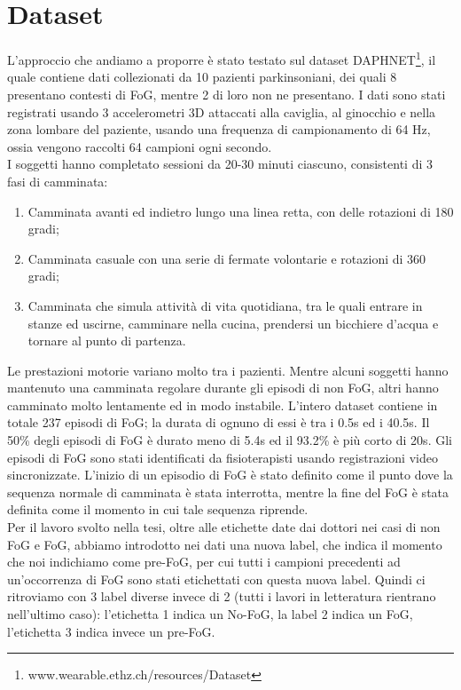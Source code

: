 \section{Dataset}
L'approccio che andiamo a proporre è stato testato sul dataset DAPHNET\footnote{www.wearable.ethz.ch/resources/Dataset}, il quale contiene dati collezionati da 10 pazienti parkinsoniani, dei quali 8 presentano contesti di FoG, mentre 2 di loro non ne presentano. I dati sono stati registrati usando 3 accelerometri 3D attaccati alla caviglia, al ginocchio e nella zona lombare del paziente, usando una frequenza di campionamento di 64 Hz, ossia vengono raccolti 64 campioni ogni secondo.\\
I soggetti hanno completato sessioni da 20-30 minuti ciascuno, consistenti di 3 fasi di camminata:
\begin{enumerate}
	\item Camminata avanti ed indietro lungo una linea retta, con delle rotazioni di 180 gradi;
	\item Camminata casuale con una serie di fermate volontarie e rotazioni di 360 gradi;
	\item Camminata che simula attività di vita quotidiana, tra le quali entrare in stanze ed uscirne, camminare nella cucina, prendersi un bicchiere d'acqua e tornare al punto di partenza.
\end{enumerate}
Le prestazioni motorie variano molto tra i pazienti. Mentre alcuni soggetti hanno mantenuto una camminata regolare durante gli episodi di non FoG, altri hanno camminato molto lentamente ed in modo instabile. L'intero dataset contiene in totale 237 episodi di FoG; la durata di ognuno di essi è tra i 0.5s ed i 40.5s. Il 50\% degli episodi di FoG è durato meno di 5.4s ed il 93.2\% è più corto di 20s. Gli episodi di FoG sono stati identificati da fisioterapisti usando registrazioni video sincronizzate. L'inizio di un episodio di FoG è stato definito come il punto dove la sequenza normale di camminata è stata interrotta, mentre la fine del FoG è stata definita come il momento in cui tale sequenza riprende.\\
Per il lavoro svolto nella tesi, oltre alle etichette date dai dottori nei casi di non FoG e FoG, abbiamo introdotto nei dati una nuova label, che indica il momento che noi indichiamo come pre-FoG, per cui tutti i campioni precedenti ad un'occorrenza di FoG sono stati etichettati con questa nuova label. Quindi ci ritroviamo con 3 label diverse invece di 2 (tutti i lavori in letteratura rientrano nell'ultimo caso): l'etichetta 1 indica un No-FoG, la label 2 indica un FoG, l'etichetta 3 indica invece un pre-FoG.
